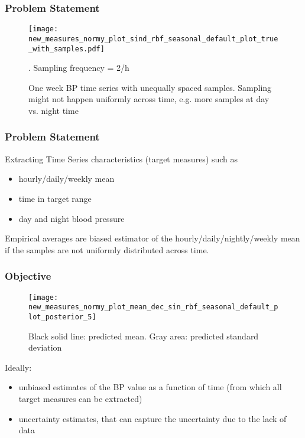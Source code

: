 \documentclass[
	8pt, %
]{beamer}
\begin{document}


\begin{frame}
	\frametitle{Problem Statement}

		\begin{figure}
				\texttt{[image: new\_measures\_normy\_plot\_sind\_rbf\_seasonal\_default\_plot\_true\_with\_samples.pdf]}
				\caption{One week BP time series with unequally spaced samples. Sampling might not happen
				uniformly across time, e.g. more samples at day vs. night time}. Sampling frequency = 2/h
		\end{figure}

\end{frame}


\begin{frame}
	\frametitle{Problem Statement}

		Extracting Time Series characteristics (target measures) such as
		\begin{itemize}
		\item hourly/daily/weekly mean
		\item time in target range
		\item day and night blood pressure
		\end{itemize}

	\bigskip %

	Empirical averages are biased estimator of the hourly/daily/nightly/weekly mean if
	the samples are not uniformly distributed across time.

\end{frame}


\begin{frame}
	\frametitle{Objective}

		\begin{figure}
				\texttt{[image: new\_measures\_normy\_plot\_mean\_dec\_sin\_rbf\_seasonal\_default\_plot\_posterior\_5]}
				\caption{Black solid line: predicted mean. Gray area: predicted standard deviation}
		\end{figure}

	Ideally:
	\begin{itemize}
		\item unbiased estimates of the BP value as a function of time (from which all target
		measures can be extracted)
		\item uncertainty estimates, that can capture the uncertainty due to the lack of data
	\end{itemize}
\end{frame}
\end{document}
